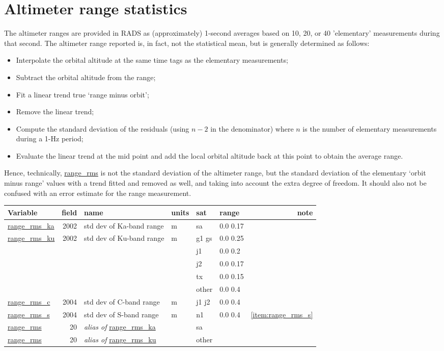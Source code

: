 \documentclass[a4paper,11pt,openany,natbib]{thesis}
\makeatletter
\newcommand\var[1]{\url{#1}\index{variables!#1@\protect\url{#1}}}
\newcommand\alias[1]{\emph{alias of} \var{#1}}
\newenvironment{vartable}{
\begin{table}[ht]
\small
\begin{tabular}{lrllllr}
\hline
Variable & field & name & units & sat & range & note \\
\hline
}{
\hline
\end{tabular}
\end{table}
}
\makeatother
\begin{document}
\section{Altimeter range statistics}
The altimeter ranges are provided in RADS as (approximately) 1-second averages based on 10, 20, or 40 'elementary' measurements during that second. The altimeter range reported is, in fact, not the statistical mean, but is generally determined as follows:
\begin{itemize}
\item Interpolate the orbital altitude at the same time tags as the elementary measurements;
\item Subtract the orbital altitude from the range;
\item Fit a linear trend true `range minus orbit';
\item Remove the linear trend;
\item Compute the standard deviation of the residuals (using $n-2$ in the denominator) where $n$ is the number of elementary measurements during a 1-Hz period;
\item Evaluate the linear trend at the mid point and add the local orbital altitude back at this point to obtain the average range.
\end{itemize}
Hence, technically, \var{range_rms} is not the standard deviation of the altimeter range, but the standard deviation of the elementary `orbit minus range' values with a trend fitted and removed as well, and taking into account the extra degree of freedom. It should also not be confused with an error estimate for the range measurement.

\begin{vartable}
\var{range_rms_ka} & 2002 & std dev of Ka-band range & m & sa & 0.0 0.17 & \\
\var{range_rms_ku} & 2002 & std dev of Ku-band range & m & g1 gs & 0.0 0.25 & \\
                    &      &                          &   & j1 & 0.0 0.2 & \\
                    &      &                          &   & j2 & 0.0 0.17 & \\
                    &      &                          &   & tx & 0.0 0.15 & \\
                    &      &                          &   & other & 0.0 0.4 & \\
\var{range_rms_c}  & 2004 & std dev of C-band range  & m & j1 j2 & 0.0 0.4 & \\
\var{range_rms_s}  & 2004 & std dev of S-band range  & m & n1 & 0.0 0.4 & \ref{item:range_rms_s} \\
\hline
\var{range_rms}    &   20 & \alias{range_rms_ka} && sa && \\
\var{range_rms}    &   20 & \alias{range_rms_ku} && other && \\
\end{vartable}
\end{document}
